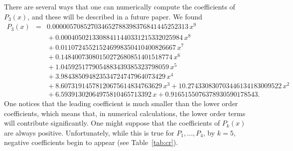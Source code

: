 \documentclass[12pt,letterpaper]{amsart}
\theoremstyle{plain}
\theoremstyle{definition}
\theoremstyle{remark}
\numberwithin{equation}{subsection}
\numberwithin{theorem}{subsection}
\numberwithin{table}{subsection}
\begin{document}
There are several ways that one can numerically compute the
coefficients of $P_3(x)$, and these will be described in a future paper.
We found
\begin{eqnarray}
P_3(x)& =  &0.000005708527034652788398376841445252313\,x^9 \nonumber \\
&   &\mbox{} + 0.00040502133088411440331215332025984\,x^8 \nonumber \\
&   &\mbox{} +  0.011072455215246998350410400826667\,x^7 \nonumber \\
&   &\mbox{} + 0.14840073080150272680851401518774\,x^6 \nonumber \\
&   &\mbox{} +  1.0459251779054883439385323798059\,x^5 \nonumber \\
&   &\mbox{} + 3.984385094823534724747964073429\,x^4 \nonumber \\
&   &\mbox{} +  8.60731914578120675614834763629\,x^3 + 10.274330830703446134183009522\,x^2 \nonumber \\
&   &\mbox{} +  6.59391302064975810465713392\,x + 0.9165155076378930590178543.
 \end{eqnarray}
One notices that the leading coefficient is much smaller than the
lower order coefficients, which means that, in numerical
calculations, the lower order terms will contribute significantly.
One might suppose that the coefficients of $P_k(x)$ are always
positive. Unfortunately, while this is true for $P_1,\ldots,P_4$,
by $k=5$, negative coefficients begin to appear (see Table~\ref{tab:cr}).
\end{document}
